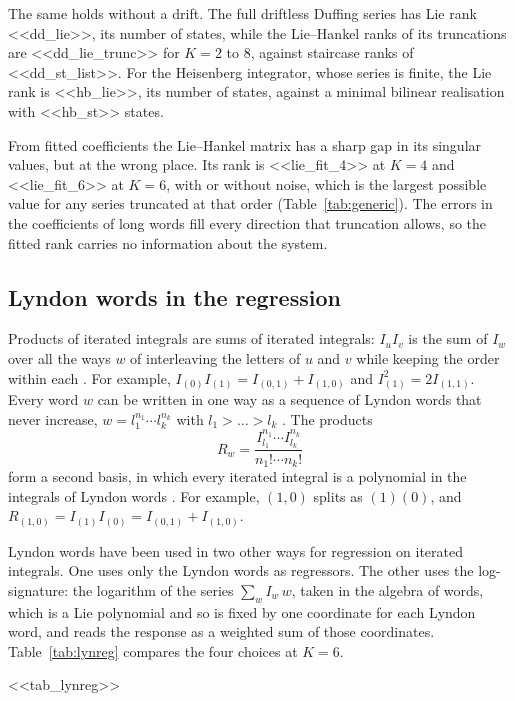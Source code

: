 \documentclass[11pt,a4paper]{article}
\theoremstyle{remark}
\begin{document}
The same holds without a drift.
The full driftless Duffing series has Lie rank <<dd_lie>>, its number of states, while the Lie--Hankel ranks of its truncations are <<dd_lie_trunc>> for $K=2$ to 8, against staircase ranks of <<dd_st_list>>.
For the Heisenberg integrator, whose series is finite, the Lie rank is <<hb_lie>>, its number of states, against a minimal bilinear realisation with <<hb_st>> states.

From fitted coefficients the Lie--Hankel matrix has a sharp gap in its singular values, but at the wrong place.
Its rank is <<lie_fit_4>> at $K=4$ and <<lie_fit_6>> at $K=6$, with or without noise, which is the largest possible value for any series truncated at that order (Table~\ref{tab:generic}).
The errors in the coefficients of long words fill every direction that truncation allows, so the fitted rank carries no information about the system.

\subsection{Lyndon words in the regression}
Products of iterated integrals are sums of iterated integrals: $I_uI_v$ is the sum of $I_w$ over all the ways $w$ of interleaving the letters of $u$ and $v$ while keeping the order within each \cite{Ree1958}.
For example, $I_{(0)}I_{(1)}=I_{(0,1)}+I_{(1,0)}$ and $I_{(1)}^2=2I_{(1,1)}$.
Every word $w$ can be written in one way as a sequence of Lyndon words that never increase, $w=l_1^{n_1}\cdots l_k^{n_k}$ with $l_1>\dots>l_k$ \cite{ChenFoxLyndon1958}.
The products
\[R_w=\frac{I_{l_1}^{n_1}\cdots I_{l_k}^{n_k}}{n_1!\cdots n_k!}\]
form a second basis, in which every iterated integral is a polynomial in the integrals of Lyndon words \cite{Radford1979,Reutenauer1993}.
For example, $(1,0)$ splits as $(1)(0)$, and $R_{(1,0)}=I_{(1)}I_{(0)}=I_{(0,1)}+I_{(1,0)}$.

Lyndon words have been used in two other ways for regression on iterated integrals.
One uses only the Lyndon words as regressors.
The other uses the log-signature: the logarithm of the series $\sum_wI_w\,w$, taken in the algebra of words, which is a Lie polynomial and so is fixed by one coordinate for each Lyndon word, and reads the response as a weighted sum of those coordinates.
Table~\ref{tab:lynreg} compares the four choices at $K=6$.

\begin{table}[t]\centering\small
\caption{Regression in four bases at $K=6$, 0.15\,s, all with the ridge penalty. $R^2$ on the test trials without noise and at 1\,\% noise (standard deviation 1\,\% of that of the response) (median over <<n_seeds>> draws). The Lyndon products give the same model as all words; with least squares their predictions agree to <<rad_diff>>.}\label{tab:lynreg}
<<tab_lynreg>>
\end{table}
\end{document}
